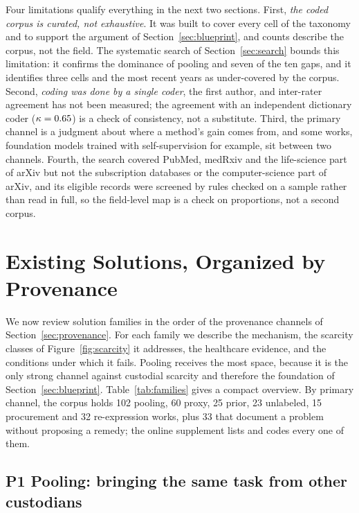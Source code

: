 \documentclass[acmsmall,screen,review]{acmart}
\theoremstyle{acmdefinition}
\begin{document}
Four limitations qualify everything in the next two sections. First, \emph{the coded corpus is curated, not exhaustive}. It was built to cover every cell of the taxonomy and to support the argument of Section~\ref{sec:blueprint}, and counts describe the corpus, not the field. The systematic search of Section~\ref{sec:search} bounds this limitation: it confirms the dominance of pooling and seven of the ten gaps, and it identifies three cells and the most recent years as under-covered by the corpus. Second, \emph{coding was done by a single coder}, the first author, and inter-rater agreement has not been measured; the agreement with an independent dictionary coder ($\kappa=0.65$) is a check of consistency, not a substitute. Third, the primary channel is a judgment about where a method's gain comes from, and some works, foundation models trained with self-supervision for example, sit between two channels. Fourth, the search covered PubMed, medRxiv and the life-science part of arXiv but not the subscription databases or the computer-science part of arXiv, and its eligible records were screened by rules checked on a sample rather than read in full, so the field-level map is a check on proportions, not a second corpus.

\section{Existing Solutions, Organized by Provenance}\label{sec:solutions}

 We now review solution families in the order of the provenance channels of Section~\ref{sec:provenance}. For each family we describe the mechanism, the scarcity classes of Figure~\ref{fig:scarcity} it addresses, the healthcare evidence, and the conditions under which it fails. Pooling receives the most space, because it is the only strong channel against custodial scarcity and therefore the foundation of Section~\ref{sec:blueprint}. Table~\ref{tab:families} gives a compact overview. By primary channel, the corpus holds 102 pooling, 60 proxy, 25 prior, 23 unlabeled, 15 procurement and 32 re-expression works, plus 33 that document a problem without proposing a remedy; the online supplement lists and codes every one of them.

\subsection{P1 Pooling: bringing the same task from other custodians}\label{sec:S6_1}
\end{document}
